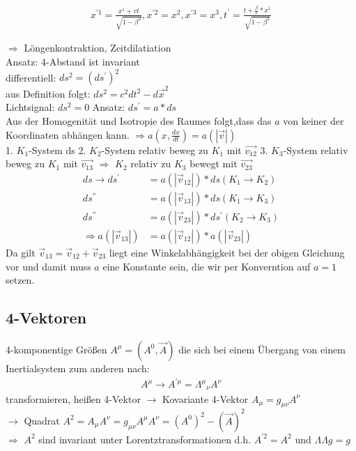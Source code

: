 \documentclass[a4paper]{article}
\begin{document}
\begin{align}
x^{'1}=\frac{x^1+vt}{\sqrt{1-\beta^2}}, x^{'2}=x^2, x^{'3}=x^3,
t^{'}=\frac{t+\frac{\beta}{c}*x^1}{\sqrt{1-\beta^2}}
\end{align}

$\Rightarrow$ Löngenkontraktion, Zeitdilatiation\\
Ansatz: 4-Abstand ist invariant\\
differentiell: $ds^2=(ds^{'})^2$\\
aus Definition folgt: $ds^2=c^2dt^2-d\vec{x}^2$\\
Lichtsignal: $ds^2=0$
Ansatz: $ds^{'}=a*ds$\\
Aus der Homogenität und Isotropie des Raumes folgt,dass das $a$ von keiner
der Koordinaten abhängen kann. $\Rightarrow a(x,\frac{dx}{dt})=a(|\vec{v}|)$\\
1. $K_1$-System ds
2. $K_2$-System relativ beweg zu $K_1$ mit $\vec{v_{12}}$
3. $K_3$-System relativ beweg zu $K_1$ mit $\vec{v_{13}}$
$\Rightarrow$ $K_2$ relativ zu $K_3$ bewegt mit $\vec{v_{23}}$
\begin{align}
ds \rightarrow ds^{'}&=a(|\vec{v}_{12}|)*ds (K_1 \rightarrow K_2)\\
ds^{''}&=a(|\vec{v}_{13}|)*ds (K_1 \rightarrow K_3)\\
ds^{''}&=a(|\vec{v}_{23}|)*ds^{'} (K_2 \rightarrow K_3)\\
\Rightarrow  a(|\vec{v}_{13}|)&=a(|\vec{v}_{12}|)*a(|\vec{v}_{23}|)
\end{align}
Da gilt $\vec{v}_{13}=\vec{v}_{12}+\vec{v}_{23}$ liegt eine Winkelabhängigkeit
bei der obigen Gleichung vor und damit muss $a$ eine Konstante sein, die wir per
Konverntion auf $a=1$ setzen.

\subsection{4-Vektoren}
4-komponentige Größen $A^\mu=(A^0,\vec{A})$ die sich bei einem Übergang von
einem Inertialsystem zum anderen nach:
\begin{align}
A^{\mu}\rightarrow A^{'\mu}=\Lambda^\mu{}_\nu A^\nu
\end{align}
transformieren, heißen 4-Vektor
$\rightarrow$ Kovariante 4-Vektor $A_\mu=g_{\mu \nu} A^\nu$\\
$\rightarrow$ Quadrat $A^2 = A_\mu A^\nu= g_{\mu \nu} A^\mu  A^\nu =
(A^0)^2-(\vec{A})^2$\\
$\Rightarrow$ $A^2$ sind invariant unter Lorentztransformationen d.h.
$A^{'2}=A^2$ und $\Lambda \Lambda g=g$
\end{document}
